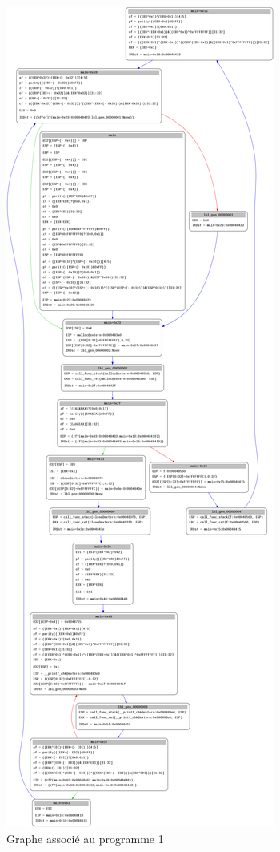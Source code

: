 \begin{figure}[h]
    \centering
    \includegraphics[scale=0.125]{images/simple-graph.png}
    \caption{Graphe associé au programme 1}
\end{figure}

